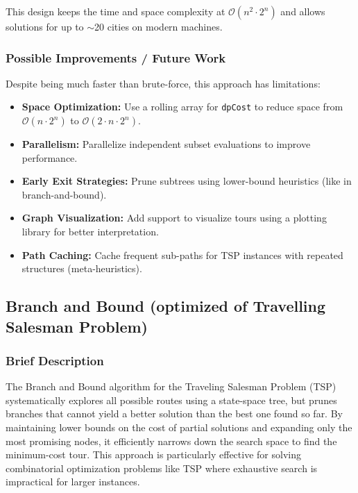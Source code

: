\documentclass{article}
\begin{document}
This design keeps the time and space complexity at $\mathcal{O}(n^2 \cdot 2^n)$ and allows solutions for up to $\sim$20 cities on modern machines.


\subsubsection*{Possible Improvements / Future Work}    
Despite being much faster than brute-force, this approach has limitations:

\begin{itemize}
    \item \textbf{Space Optimization:} Use a rolling array for \texttt{dpCost} to reduce space from $\mathcal{O}(n \cdot 2^n)$ to $\mathcal{O}(2 \cdot n \cdot 2^n)$.
    \item \textbf{Parallelism:} Parallelize independent subset evaluations to improve performance.
    \item \textbf{Early Exit Strategies:} Prune subtrees using lower-bound heuristics (like in branch-and-bound).
    \item \textbf{Graph Visualization:} Add support to visualize tours using a plotting library for better interpretation.
    \item \textbf{Path Caching:} Cache frequent sub-paths for TSP instances with repeated structures (meta-heuristics).
\end{itemize}



\subsection{Branch and Bound (optimized of Travelling Salesman Problem)}
\subsubsection*{Brief Description}
The Branch and Bound algorithm for the Traveling Salesman Problem (TSP) systematically explores all possible routes using a state-space tree, but prunes branches that cannot yield a better solution than the best one found so far. By maintaining lower bounds on the cost of partial solutions and expanding only the most promising nodes, it efficiently narrows down the search space to find the minimum-cost tour. This approach is particularly effective for solving combinatorial optimization problems like TSP where exhaustive search is impractical for larger instances.
\end{document}
